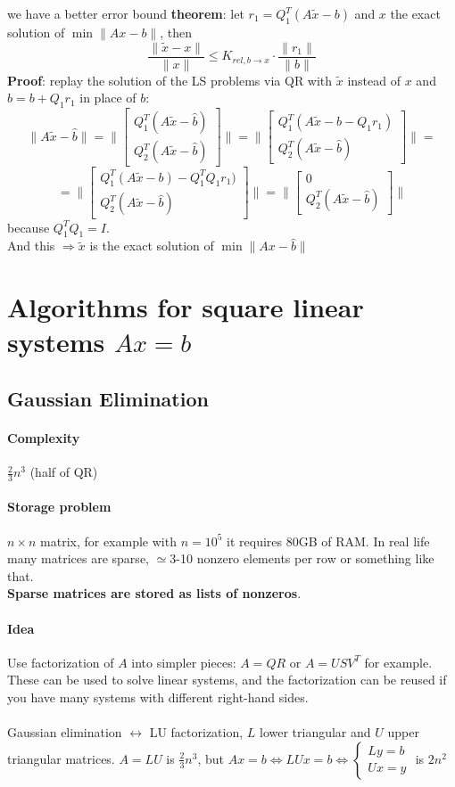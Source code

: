 \documentclass[10pt]{report}
\begin{document}
we have a better error bound \textbf{theorem}: let $r_1 = Q_1^T(A\tilde{x}-b)$ and $x$ the exact solution of $\min\|Ax-b\|$, then $$\frac{\|\tilde{x}-x\|}{\|x\|}\leq K_{rel, b\rightarrow x}\cdot\frac{\|r_1\|}{\|b\|}$$
\textbf{Proof}: replay the solution of the LS problems via QR with $\tilde{x}$ instead of $x$ and $\hat{b}=b+Q_1r_1$ in place of $b$: $$\|A\tilde{x}-\hat{b}\| = \|\left[\begin{array}{c}
Q_1^T(A\tilde{x}-\hat{b})\\Q_2^T(A\tilde{x}-\hat{b})
\end{array}\right]\|=\|\left[\begin{array}{c}
Q_1^T(A\tilde{x}-b-Q_1r_1)\\
Q_2^T(A\tilde{x}-\hat{b})
\end{array}\right]\|=$$
$$=\|\left[\begin{array}{c}
Q_1^T(A\tilde{x}-b)-Q_1^TQ_1r_1)\\
Q_2^T(A\tilde{x}-\hat{b})
\end{array}\right]\|=\|\left[\begin{array}{c}
0\\
Q_2^T(A\tilde{x}-\hat{b})
\end{array}\right]\|$$
because $Q_1^TQ_1=I$.\\
And this $\Rightarrow\tilde{x}$ is the exact solution of $\min\|Ax-\hat{b}\|$
\section{Algorithms for square linear systems $Ax=b$}
\subsection{Gaussian Elimination}
\paragraph{Complexity} $\frac{2}{3}n^3$ (half of QR)
\paragraph{Storage problem} $n\times n$ matrix, for example with $n=10^5$ it requires 80GB of RAM. In real life many matrices are sparse, $\simeq$3-10 nonzero elements per row or something like that.\\
\textbf{Sparse matrices are stored as lists of nonzeros}.
\paragraph{Idea} Use factorization of $A$ into simpler pieces: $A=QR$ or $A=USV^T$ for example. These can be used to solve linear systems, and the factorization can be reused if you have many systems with different right-hand sides.\\\\
Gaussian elimination $\leftrightarrow$ LU factorization, $L$ lower triangular and $U$ upper triangular matrices. $A = LU$ is $\frac{2}{3}n^3$, but $Ax=b\Leftrightarrow LUx = b\Leftrightarrow\left\{\begin{array}{l}
Ly=b\\Ux=y
\end{array}\right.$ is $2n^2$
\end{document}
